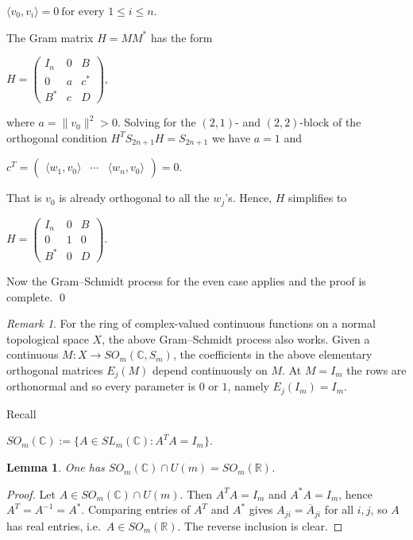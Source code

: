 \documentclass[11pt]{amsart}
\newtheorem{lemma}[theorem]{Lemma}
\theoremstyle{definition}
\theoremstyle{remark}
\theoremstyle{remark}
\newtheorem{remark}[theorem]{Remark}
\newcommand{\C}{\mathbb{C}}
\begin{document}
\begin{center}
    $\langle v_0,v_i\rangle=0\ \text{for every }1\leq i\leq n.$
\end{center}
The Gram matrix $H =MM^*$ has the form
\begin{center}
    $H=
\begin{pmatrix}
I_n&0&B\\
0&a&c^*\\
B^* &c&D
\end{pmatrix},$
\end{center}
where
$
a=\|v_0\|^2>0$. Solving for the $(2,1)$- and $(2,2)$-block of the orthogonal condition $H^T S_{2n+1} H = S_{2n+1}$ we have $a = 1$ and 
\begin{center}
$c^T =
\begin{pmatrix}
\langle w_1,v_0\rangle &
\cdots &
\langle w_n,v_0\rangle
\end{pmatrix} = 0 .$
\end{center}
That is $v_0$ is already orthogonal to all the $w_j$'s. Hence, $H$ simplifies to
\begin{center}
    $H=
\begin{pmatrix}
I_n&0&B\\
0&1&0\\
B^*&0&D
\end{pmatrix}.$
\end{center}
Now the Gram--Schmidt process for the even case applies and   the proof is complete. \hfill \qed

\begin{remark} \label{cont-GS}
    For the ring of complex-valued continuous functions on a normal topological space $X$, the above Gram--Schmidt process also works. Given a continuous $M : X \to SO_m(\C, S_m)$, the coefficients in the above elementary orthogonal matrices $E_j(M)$ depend continuously on $M$. At $M = I_m$ the rows are orthonormal and so every parameter is $0$ or $1$, namely $E_j(I_m) = I_m$. 
\end{remark}

Recall
\begin{center}
    $SO_{m}(\mathbb C):=\{A\in SL_{m}(\mathbb C): A^T A=I_{m}\}.$
\end{center}

\begin{lemma} \label{lem:model}
One has $SO_{m}(\mathbb C)\cap U(m)=SO_{m}(\mathbb R)$.
\end{lemma}

\begin{proof}
Let $A\in SO_{m}(\mathbb C)\cap U(m)$. Then $A^TA=I_m$ and $A^\ast A=I_m$, hence $A^T=A^{-1}=A^\ast$.
Comparing entries of $A^T$ and $A^\ast$ gives $A_{ji}=\overline{A}_{ji}$ for all $i,j$, so $A$ has real entries,
i.e.\ $A\in SO_{m}(\mathbb R)$. The reverse inclusion is clear.
\end{proof}
\end{document}
